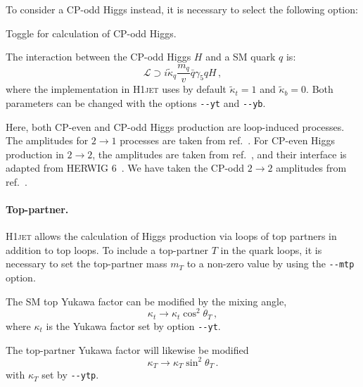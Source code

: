 \documentclass[12pt]{article}
\begin{document}
\noindent
To consider a CP-odd Higgs instead, it is necessary to select the following option: 
\begin{description}[labelindent=1cm, labelwidth =\widthof{\bfseries9999999999999999999999}, leftmargin = !] 
	\item[\texttt{-{}-cpodd}] Toggle for calculation of CP-odd Higgs. 
\end{description}
The interaction between the CP-odd Higgs $H$ and a SM quark $q$ is: 
\begin{equation}
   \mathcal{L} \supset i \tilde{\kappa}_q \frac{m_q}{v} \bar{q} \gamma_5 q H\,,
\end{equation}
where the implementation in \textsc{H1jet} uses by default $\tilde{\kappa}_t = 1$ and $\tilde{\kappa}_b = 0$. Both parameters can be changed with the options \texttt{-{}-yt} and \texttt{-{}-yb}.

Here, both CP-even and CP-odd Higgs production are loop-induced
processes. The amplitudes for $2\to 1$ processes are taken from
ref.~\cite{Spira:1995rr}. For CP-even Higgs production in $2\to 2$,
the amplitudes are taken from ref.~\cite{Baur:1989cm}, and their
interface is adapted from \textsc{HERWIG 6}~\cite{Corcella:2000bw}. We have taken the CP-odd $2\to 2$
amplitudes from ref.~\cite{Grojean:2013nya}.

\paragraph{Top-partner.} \textsc{H1jet} allows the calculation of
Higgs production via loops of top partners in addition to top loops.
To include a top-partner $T$ in the quark loops, it is necessary
to set the top-partner mass $m_T$ to a non-zero value by using the
\texttt{-{}-mtp} option.

The SM top Yukawa factor can be modified by the mixing angle, 
\begin{equation}
   \kappa_t \rightarrow \kappa_t \cos^2\theta_T \,, 
\end{equation} 
where $\kappa_t$ is the Yukawa factor set by option \texttt{-{}-yt}. 

The top-partner Yukawa factor will likewise be modified 
\begin{equation}
   \kappa_T \rightarrow \kappa_T \sin^2\theta_T \,. 
\end{equation} 
with $\kappa_T$ set by \texttt{-{}-ytp}.
\end{document}
